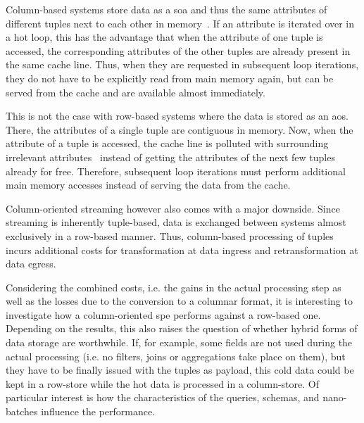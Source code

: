 Column-based systems store data as a \ac{soa} and thus the same attributes of different tuples next to each other in memory~\cite{DBLP:conf/sigmod/AbadiMH08,DBLP:conf/vldb/AilamakiDHS01}.
If an attribute is iterated over in a hot loop, this has the advantage that when the attribute of one tuple is accessed, the corresponding attributes of the other tuples are already present in the same cache line.
Thus, when they are requested in subsequent loop iterations, they do not have to be explicitly read from main memory again, but can be served from the cache and are available almost immediately.

This is not the case with row-based systems where the data is stored as an \ac{aos}.
There, the attributes of a single tuple are contiguous in memory.
Now, when the attribute of a tuple is accessed, the cache line is polluted with surrounding irrelevant attributes~\cite{DBLP:conf/sigmod/AbadiMH08,DBLP:conf/vldb/AilamakiDHS01} instead of getting the attributes of the next few tuples already for free.
Therefore, subsequent loop iterations must perform additional main memory accesses instead of serving the data from the cache.

Column-oriented streaming however also comes with a major downside.
Since streaming is inherently tuple-based, data is exchanged between systems almost exclusively in a row-based manner.
Thus, column-based processing of tuples incurs additional costs for transformation at data ingress and retransformation at data egress.

Considering the combined costs, i.e. the gains in the actual processing step as well as the losses due to the conversion to a columnar format, it is interesting to investigate how a column-oriented \ac{spe} performs against a row-based one.
Depending on the results, this also raises the question of whether hybrid forms of data storage are worthwhile.
If, for example, some fields are not used during the actual processing (i.e. no filters, joins or aggregations take place on them), but they have to be finally issued with the tuples as payload, this cold data could be kept in a row-store while the hot data is processed in a column-store.
Of particular interest is how the characteristics of the queries, schemas, and nano-batches influence the performance.